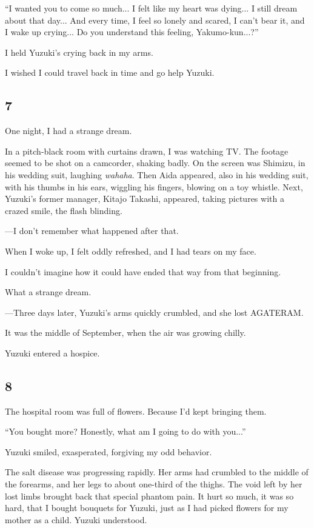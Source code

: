 \documentclass[
    a4paper,
    12pt,
    twoside,
    openany,
    UTF8,
    fontset=windows
]{ctexbook}
\begin{document}
``I wanted you to come so much... I felt like my heart was dying... I still dream about that day... And every time, I feel so lonely and scared, I can't bear it, and I wake up crying... Do you understand this feeling, Yakumo-kun...?''

I held Yuzuki's crying back in my arms.

I wished I could travel back in time and go help Yuzuki.


\subsection*{7}

One night, I had a strange dream.

In a pitch-black room with curtains drawn, I was watching TV. The footage seemed to be shot on a camcorder, shaking badly. On the screen was Shimizu, in his wedding suit, laughing \textit{wahaha}. Then Aida appeared, also in his wedding suit, with his thumbs in his ears, wiggling his fingers, blowing on a toy whistle. Next, Yuzuki's former manager, Kitajo Takashi, appeared, taking pictures with a crazed smile, the flash blinding.

---I don't remember what happened after that.

When I woke up, I felt oddly refreshed, and I had tears on my face.

I couldn't imagine how it could have ended that way from that beginning.

What a strange dream.

---Three days later, Yuzuki's arms quickly crumbled, and she lost AGATERAM.

It was the middle of September, when the air was growing chilly.

Yuzuki entered a hospice.


\subsection*{8}

The hospital room was full of flowers. Because I'd kept bringing them.

``You bought more? Honestly, what am I going to do with you...''

Yuzuki smiled, exasperated, forgiving my odd behavior.

The salt disease was progressing rapidly. Her arms had crumbled to the middle of the forearms, and her legs to about one-third of the thighs. The void left by her lost limbs brought back that special phantom pain. It hurt so much, it was so hard, that I bought bouquets for Yuzuki, just as I had picked flowers for my mother as a child. Yuzuki understood.
\end{document}

